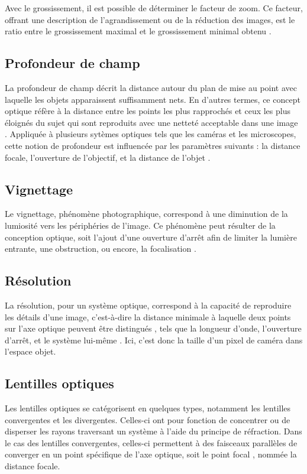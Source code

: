 \documentclass[11pt,letterpaper]{article}
\begin{document}
Avec le grossissement, il est possible de déterminer le facteur de zoom. Ce facteur, offrant une description de l'agrandissement ou de la réduction des images, est le ratio entre le grossissement maximal et le grossissement minimal obtenu \cite{noauthor_videoprojecteur_2024}.

\subsection{Profondeur de champ}
La profondeur de champ décrit la distance autour du plan de mise au point avec laquelle les objets apparaissent suffisamment nets. En d'autres termes, ce concept optique réfère à la distance entre les points les plus rapprochés et ceux les plus éloignés du sujet qui sont reproduits avec une netteté acceptable dans une image \cite{hollows_depth_2023}. Appliquée à plusieurs sytèmes optiques tels que les caméras et les microscopes, cette notion de profondeur est influencée par les paramètres suivants : la distance focale, l'ouverture de l'objectif, et la distance de l'objet \cite{leblond_semaine_2024}. 

\subsection{Vignettage}
Le vignettage, phénomène photographique, correspond à une diminution de la lumiosité vers les périphéries de l'image. Ce phénomène peut résulter de la conception optique, soit l'ajout d'une ouverture d'arrêt afin de limiter la lumière entrante, une obstruction, ou encore, la focalisation \cite{cognard_comprendre_2017}.

\subsection{Résolution}
La résolution, pour un système optique, correspond à la capacité de reproduire les détails d'une image, c'est-à-dire la distance minimale à laquelle deux points sur l'axe optique peuvent être distingués \cite{fouquet_improving_2015}, tels que la longueur d'onde, l'ouverture d'arrêt, et le système lui-même \cite{jonkman_18_2003}. Ici, c'est donc la taille d'un pixel de caméra dans l'espace objet.

\subsection{Lentilles optiques}
Les lentilles optiques se catégorisent en quelques types, notamment les lentilles convergentes et les divergentes. Celles-ci ont pour fonction de concentrer ou de disperser les rayons traversant un système à l'aide du principe de réfraction. Dans le cas des lentilles convergentes, celles-ci permettent à des faisceaux parallèles de converger en un point spécifique de l'axe optique, soit le point focal \cite{noauthor_thin_nodate}, nommée la distance focale. 
\end{document}
